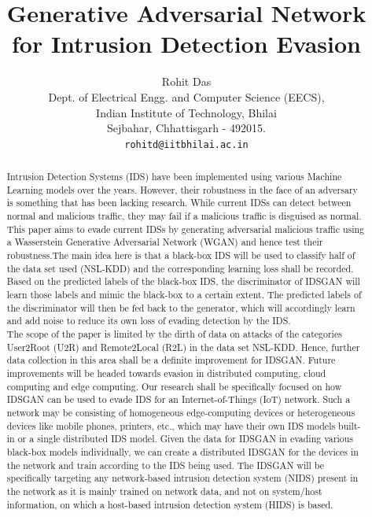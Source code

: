 \documentclass[10pt, conference, compsocconf]{IEEEtran}
\author{ \parbox{5 in}{\centering Rohit Das\\
         Dept. of Electrical Engg. and Computer Science (EECS),\\
         Indian Institute of Technology, Bhilai\\
         Sejbahar, Chhattisgarh - 492015.\\
         {\tt\small rohitd@iitbhilai.ac.in}} %
}
\begin{document}
\title{Generative Adversarial Network for Intrusion Detection Evasion}
\maketitle

\begin{abstract}

Intrusion Detection Systems (IDS) have been implemented using various Machine Learning models over the years. However, their robustness in the face of an adversary is something that has been lacking research. While current IDSs can detect between normal and malicious traffic, they may fail if a malicious traffic is disguised as normal. This paper aims to evade current IDSs by generating adversarial malicious traffic using a Wasserstein Generative Adversarial Network (WGAN) and hence test their robustness.The main idea here is that a black-box IDS will be used to classify half of the data set used (NSL-KDD) and the corresponding learning loss shall be recorded. Based on the predicted labels of the black-box IDS, the discriminator of IDSGAN will learn those labels and mimic the black-box to a certain extent. The predicted labels of the discriminator will then be fed back to the generator, which will accordingly learn and add noise to reduce its own loss of evading detection by the IDS.\\

The scope of the paper is limited by the dirth of data on attacks of the categories User2Root (U2R) and Remote2Local (R2L) in the data set NSL-KDD. Hence, further data collection in this area shall be a definite improvement for IDSGAN. Future improvements will be headed towards evasion in distributed computing, cloud computing and edge computing. Our research shall be specifically focused on how IDSGAN can be used to evade IDS for an Internet-of-Things (IoT) network. Such a network may be consisting of homogeneous edge-computing devices or heterogeneous devices like mobile phones, printers, etc., which may have their own IDS models built-in or a single distributed IDS model. Given the data for IDSGAN in evading various black-box models individually, we can create a distributed IDSGAN for the devices in the network and train according to the IDS being used. The IDSGAN will be specifically targeting any network-based intrusion detection system (NIDS) present in the network as it is mainly trained on network data, and not on system/host information, on which a host-based intrusion detection system (HIDS) is based.

\end{abstract}
\end{document}
